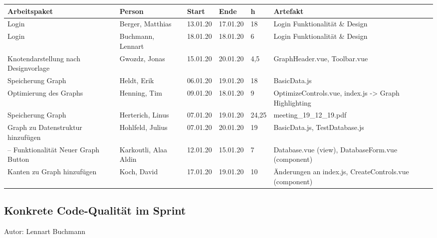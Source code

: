 \begin{longtable}{|p{4cm}|p{2cm}|p{1.2cm}|p{1.2cm}|p{0.7cm}|p{3.8cm}|}
  \hline
  Arbeitspaket                                                          & Person                & Start    & Ende     & h     & Artefakt                                                    \\ \hline
  Login                                                             & Berger, Matthias      & 13.01.20 & 17.01.20 & 18   & Login Funktionalität \& Design                              \\ \hline
  Login                                                             & Buchmann, Lennart     & 18.01.20 & 18.01.20 & 6     & Login Funktionalität \& Design                              \\ \hline
  Knotendarstellung nach Designvorlage        & Gwozdz, Jonas         & 15.01.20 & 20.01.20 & 4,5     & GraphHeader.vue, Toolbar.vue                                \\ \hline
  Speicherung Graph			        &  Heldt, Erik           & 06.01.20 & 19.01.20 & 18  & BasicData.js                                                \\ \hline
  Optimierung des Graphs 			        & Henning, Tim          & 09.01.20 & 18.01.20 & 9     & OptimizeControls.vue, index.js -> Graph Highlighting        \\ \hline
  Speicherung Graph                                      & Herterich, Linus      & 07.01.20 & 19.01.20 & 24,25     & meeting\_19\_12\_19.pdf                                     \\ \hline
  Graph zu Datenstruktur hinzufügen             & Hohlfeld, Julius      & 07.01.20 & 20.01.20 & 19     & BasicData.js, TestDatabase.js                               \\ \hline--
  Funktionalität Neuer Graph Button               & Karkoutli, Alaa Aldin & 12.01.20 & 15.01.20 & 7  & Database.vue (view), DatabaseForm.vue (component)           \\ \hline
  Kanten zu Graph hinzufügen                         & Koch, David           & 17.01.20 & 19.01.20 & 10    & Änderungen an index.js, CreateControls.vue (component)      \\ \hline
\end{longtable}

\subsection{Konkrete Code-Qualität im Sprint}
{\small Autor: Lennart Buchmann}



